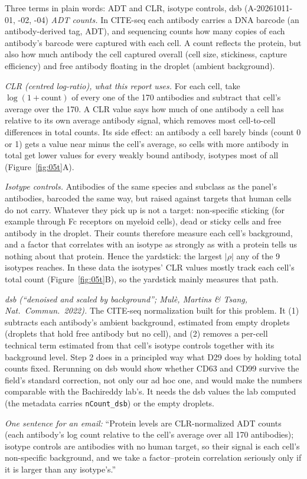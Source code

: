 \begin{explainbox}{Three terms in plain words: ADT and CLR, isotype controls, dsb (A-20261011-01, -02, -04)}
\emph{ADT counts.} In CITE-seq each antibody carries a DNA barcode (an antibody-derived tag, ADT), and sequencing counts how many copies of each antibody's barcode were captured with each cell. A count reflects the protein, but also how much antibody the cell captured overall (cell size, stickiness, capture efficiency) and free antibody floating in the droplet (ambient background).

\emph{CLR (centred log-ratio), what this report uses.} For each cell, take $\log(1 + \text{count})$ of every one of the 170 antibodies and subtract that cell's average over the 170. A CLR value says how much of one antibody a cell has relative to its own average antibody signal, which removes most cell-to-cell differences in total counts. Its side effect: an antibody a cell barely binds (count 0 or 1) gets a value near minus the cell's average, so cells with more antibody in total get lower values for every weakly bound antibody, isotypes most of all (Figure~\ref{fig:05t}A).

\emph{Isotype controls.} Antibodies of the same species and subclass as the panel's antibodies, barcoded the same way, but raised against targets that human cells do not carry. Whatever they pick up is not a target: non-specific sticking (for example through Fc receptors on myeloid cells), dead or sticky cells and free antibody in the droplet. Their counts therefore measure each cell's background, and a factor that correlates with an isotype as strongly as with a protein tells us nothing about that protein. Hence the yardstick: the largest $|\rho|$ any of the 9 isotypes reaches. In these data the isotypes' CLR values mostly track each cell's total count (Figure~\ref{fig:05t}B), so the yardstick mainly measures that path.

\emph{dsb (``denoised and scaled by background''; Mul\`e, Martins \& Tsang, \emph{Nat.\ Commun.}\ 2022).} The CITE-seq normalization built for this problem. It (1) subtracts each antibody's ambient background, estimated from empty droplets (droplets that hold free antibody but no cell), and (2) removes a per-cell technical term estimated from that cell's isotype controls together with its background level. Step 2 does in a principled way what D29 does by holding total counts fixed. Rerunning on dsb would show whether CD63 and CD99 survive the field's standard correction, not only our ad hoc one, and would make the numbers comparable with the Bachireddy lab's. It needs the dsb values the lab computed (the metadata carries \texttt{nCount\_dsb}) or the empty droplets.

\emph{One sentence for an email:} ``Protein levels are CLR-normalized ADT counts (each antibody's log count relative to the cell's average over all 170 antibodies); isotype controls are antibodies with no human target, so their signal is each cell's non-specific background, and we take a factor--protein correlation seriously only if it is larger than any isotype's.''
\end{explainbox}

